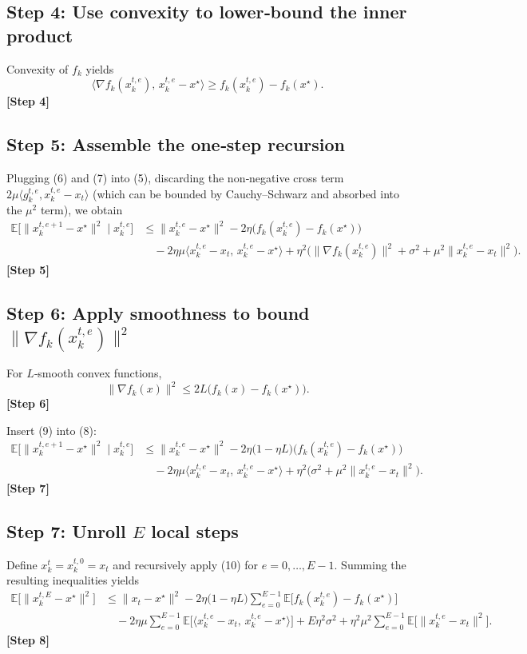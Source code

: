 \documentclass{article}
\newcommand{\E}{\mathbb{E}}
\begin{document}
\subsection*{Step 4: Use convexity to lower‑bound the inner product}
Convexity of $f_k$ yields
\[
\langle \nabla f_k(x_{k}^{t,e}),\,x_{k}^{t,e}-x^\star\rangle \ge f_k(x_{k}^{t,e})-f_k(x^\star). \tag{7}
\]
\textbf{[Step 4]}

\subsection*{Step 5: Assemble the one‑step recursion}
Plugging (6) and (7) into (5), discarding the non‑negative cross term $2\mu\langle g_{k}^{t,e},x_{k}^{t,e}-x_t\rangle$ (which can be bounded by Cauchy–Schwarz and absorbed into the $\mu^2$ term), we obtain
\begin{align}
\E\!\bigl[\|x_{k}^{t,e+1}-x^\star\|^2\mid x_{k}^{t,e}\bigr] 
&\le \|x_{k}^{t,e}-x^\star\|^2 
   -2\eta\bigl(f_k(x_{k}^{t,e})-f_k(x^\star)\bigr) \nonumber\\
&\quad -2\eta\mu\langle x_{k}^{t,e}-x_t,\,x_{k}^{t,e}-x^\star\rangle 
   +\eta^2\bigl(\|\nabla f_k(x_{k}^{t,e})\|^2+\sigma^2+\mu^2\|x_{k}^{t,e}-x_t\|^2\bigr). \tag{8}
\end{align}
\textbf{[Step 5]}

\subsection*{Step 6: Apply smoothness to bound $\|\nabla f_k(x_{k}^{t,e})\|^2$}
For $L$‑smooth convex functions,
\[
\|\nabla f_k(x)\|^2\le 2L\bigl(f_k(x)-f_k(x^\star)\bigr). \tag{9}
\]
\textbf{[Step 6]}

Insert (9) into (8):
\begin{align}
\E\!\bigl[\|x_{k}^{t,e+1}-x^\star\|^2\mid x_{k}^{t,e}\bigr] 
&\le \|x_{k}^{t,e}-x^\star\|^2 
   -2\eta\bigl(1-\eta L\bigr)\bigl(f_k(x_{k}^{t,e})-f_k(x^\star)\bigr) \nonumber\\
&\quad -2\eta\mu\langle x_{k}^{t,e}-x_t,\,x_{k}^{t,e}-x^\star\rangle 
   +\eta^2\bigl(\sigma^2+\mu^2\|x_{k}^{t,e}-x_t\|^2\bigr). \tag{10}
\end{align}
\textbf{[Step 7]}

\subsection*{Step 7: Unroll $E$ local steps}
Define $x_{k}^{t}=x_{k}^{t,0}=x_t$ and recursively apply (10) for $e=0,\dots,E-1$. Summing the resulting inequalities yields
\begin{align}
\E\!\bigl[\|x_{k}^{t,E}-x^\star\|^2\bigr] 
&\le \|x_t-x^\star\|^2 
   -2\eta\bigl(1-\eta L\bigr)\sum_{e=0}^{E-1}\E\!\bigl[f_k(x_{k}^{t,e})-f_k(x^\star)\bigr] \nonumber\\
&\quad -2\eta\mu\sum_{e=0}^{E-1}\E\!\bigl[\langle x_{k}^{t,e}-x_t,\,x_{k}^{t,e}-x^\star\rangle\bigr] 
   +E\eta^2\sigma^2 +\eta^2\mu^2\sum_{e=0}^{E-1}\E\!\bigl[\|x_{k}^{t,e}-x_t\|^2\bigr]. \tag{11}
\end{align}
\textbf{[Step 8]}
\end{document}
